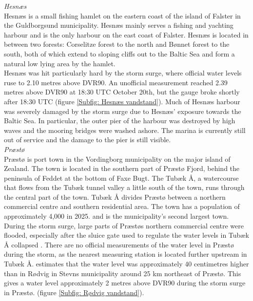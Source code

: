 \noindent
\textit{Hesnæs}\\
Hesnæs is a small fishing hamlet on the eastern coast of the island of Falster in the Guldborgsund municipality. Hesnæs mainly serves a fishing and yachting harbour and is the only harbour on the east coast of Falster. Hesnæs is located in between two forests: Corselitze forest to the north and Bønnet forest to the south, both of which extend to sloping cliffs out to the Baltic Sea and form a natural low lying area by the hamlet. \\
Hesnæs was hit particularly hard by the storm surge, where official water levels ruse to 2.10 metres above DVR90. An unofficial measurement reached 2.39 metres above DVR90 at 18:30 UTC October 20th, but the gauge broke shortly after 18:30 UTC (figure \ref{Subfig: Hesnæs vandstand}). Much of Hesnæs harbour was severely damaged by the storm surge due to Hesnæs' exposure towards the Baltic Sea. In particular, the outer pier of the harbour was destroyed by high waves and the mooring bridges were washed ashore. The marina is currently still out of service and the damage to the pier is still visible. \\

\noindent
\textit{Præstø}\\
Præstø is port town in the Vordingborg municipality on the major island of Zealand. The town is located in the southern part of Præstø Fjord, behind the peninsula of Feddet at the bottom of Faxe Bugt. The Tubæk Å, a watercourse that flows from the Tubæk tunnel valley a little south of the town, runs through the central part of the town. Tubæk Å divides Præstø between a northern commercial centre and southern residential area. The town has a population of approximately 4,000 in 2025. \citep{danmarks_statistisk_mobile_nodate} and is the municipality's second largest town.\\
During the storm surge, large parts of Præstøs northern commercial centre were flooded, especially after the sluice gate used to regulate the water levels in Tubæk Å collapsed \citep{uldall_sluseport_2023}. There are no official measurements of the water level in Præstø during the storm, as the nearest measuring station is located further upstream in Tubæk Å. \cite{cowi_praesto_2025} estimates that the water level was approximately 40 centimetres higher than in Rødvig in Stevns municipality around 25 km northeast of Præstø. This gives a water level approximately 2 metres above DVR90 during the storm surge in Præstø. (figure \ref{Subfig: Rødvig vandstand}).

